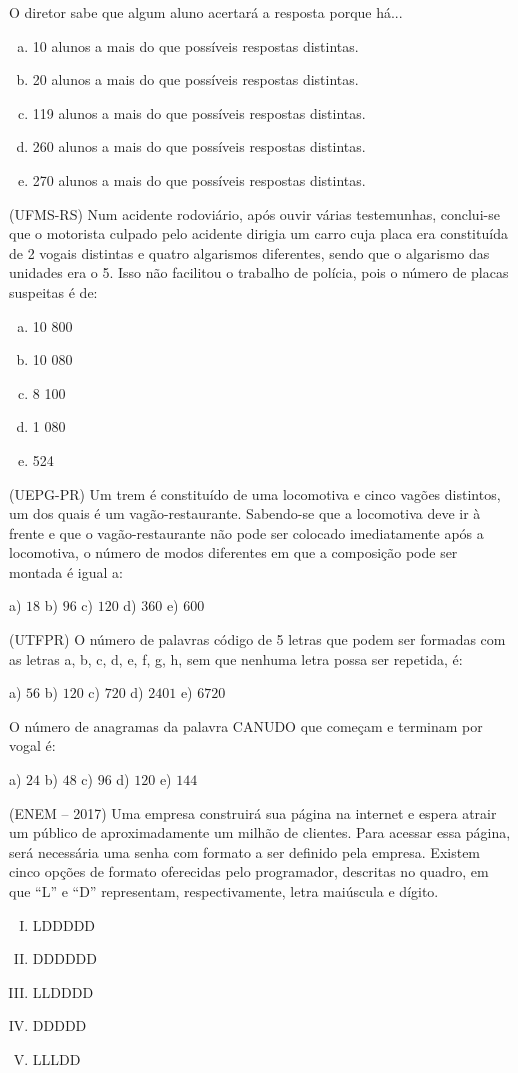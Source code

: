 \begin{multicols*}{2}
	O diretor sabe que algum aluno acertará a resposta porque há...
	\begin{enumerate}[(a)]
		\item 10 alunos a mais do que possíveis respostas distintas.
		\item 20 alunos a mais do que possíveis respostas distintas.
		\item 119 alunos a mais do que possíveis respostas distintas.
		\item 260 alunos a mais do que possíveis respostas distintas.
		\item 270 alunos a mais do que possíveis respostas distintas.
	\end{enumerate}

	\execnum (UFMS-RS) Num acidente rodoviário, após ouvir várias testemunhas, conclui-se que o motorista culpado pelo acidente dirigia um carro cuja placa era constituída de 2 vogais distintas e quatro algarismos diferentes, sendo que o algarismo das unidades era o 5. Isso não facilitou o trabalho de polícia, pois o número de placas suspeitas é de:

	\begin{enumerate}[(a)]
		\item 10 800
		\item 10 080
		\item 8 100
		\item 1 080
		\item 524
	\end{enumerate}

	\execnum (UEPG-PR) Um trem é constituído de uma locomotiva e cinco vagões distintos, um dos quais é um vagão-restaurante. Sabendo-se que a locomotiva deve ir à frente e que o vagão-restaurante não pode ser colocado imediatamente após a locomotiva, o número de modos diferentes em que a composição pode ser montada é igual a:

	a) $18 $ b) $96 $ c) $120 $ d) $360 $ e) $600 $

	\execnum (UTFPR) O número de palavras código de 5 letras que podem ser formadas com as letras a, b, c, d, e, f, g, h, sem que nenhuma letra possa ser repetida, é:

	a) $56 $ b) $120 $ c) $720 $ d) $2401 $ e) $6720 $

	\execnum O número de anagramas da palavra CANUDO que começam e terminam por vogal é:

	a) $24 $ b) $48 $ c) $96 $ d) $120 $ e) $144 $

	\execnum (ENEM -- 2017) Uma empresa construirá sua página na internet e espera atrair um público de aproximadamente um milhão de clientes. Para acessar essa página, será necessária uma senha com formato a ser definido pela empresa. Existem cinco opções de formato oferecidas pelo programador, descritas no quadro, em que “L” e “D” representam, respectivamente, letra maiúscula e dígito.
	\begin{enumerate}[I.]
		\item LDDDDD
		\item DDDDDD
		\item LLDDDD
		\item DDDDD
		\item LLLDD
	\end{enumerate}


\end{multicols*}
